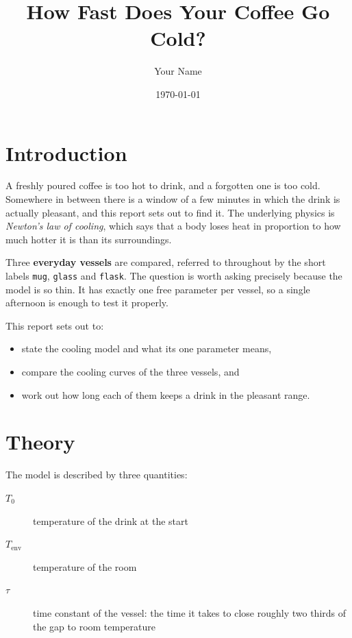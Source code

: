 \documentclass[a4paper,11pt]{article}
\title{How Fast Does Your Coffee Go Cold?}
\author{Your Name}
\date{\today}
\begin{document}
\maketitle
\tableofcontents

\section{Introduction}\label{sec:introduction}

A freshly poured coffee is too hot to drink, and a forgotten one is too cold.
Somewhere in between there is a window of a few minutes in which the drink is actually pleasant,
and this report sets out to find it.
The underlying physics is \emph{Newton's law of cooling},
which says that a body loses heat in proportion to how much hotter it is than its surroundings.

Three \textbf{everyday vessels} are compared,
referred to throughout by the short labels \texttt{mug}, \texttt{glass} and \texttt{flask}.
The question is worth asking precisely because the model is so thin.
It has exactly one free parameter per vessel,
so a single afternoon is enough to test it properly.

This report sets out to:

\begin{itemize}
    \item state the cooling model and what its one parameter means,
    \item compare the cooling curves of the three vessels, and
    \item work out how long each of them keeps a drink in the pleasant range.
\end{itemize}

\section{Theory}\label{sec:theory}

The model is described by three quantities:

\begin{description}
    \item[$T_0$] temperature of the drink at the start
    \item[$T_\mathrm{env}$] temperature of the room
    \item[$\tau$] time constant of the vessel: the time it takes to close
        roughly two thirds of the gap to room temperature
\end{description}
\end{document}

